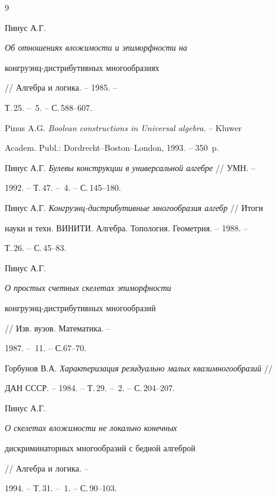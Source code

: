 \begin{thebibliography}{9}







Пинус А.Г. {\em Об отношениях вложимости и эпиморфности на


конгруэнц-дистрибутивных многообразиях} // Алгебра и логика. -- 1985. --


Т.\,25. -- \No\,5. -- С.\,588--607.




Pinus A.G. {\em Boolean constructions in Universal algebra}. -- Kluwer


Academ. Publ.: Dordrecht--Boston--London, 1993. -- 350~p.




Пинус А.Г. {\em Булевы конструкции в универсальной алгебре} // УМН. --


1992. -- Т.\,47. -- \No\,4. -- С.\,145--180.




Пинус А.Г. {\em Конгруэнц-дистрибутивные многообразия алгебр} // Итоги


науки и техн. ВИНИТИ. Алгебра. Топология. Геометрия. -- 1988. --


Т.\,26. -- С.\,45--83.




Пинус А.Г. {\em О простых счетных скелетах эпиморфности


конгруэнц-дистрибутивных многообразий} // Изв. вузов. Математика. --


1987. -- \No\,11. -- С.67--70.




Горбунов В.А. {\em Характеризация резидуально малых квазимногообразий} //


ДАН СССР. -- 1984. -- Т.\,29. -- \No\,2. -- С.\,204--207.




Пинус А.Г. {\em О скелетах вложимости не локально конечных


дискриминаторных многообразий с бедной алгеброй} // Алгебра и логика. --


1994. -- Т.\,31. -- \No\,1. -- С.\,90--103.





\end{thebibliography}





\vskip 2cm















